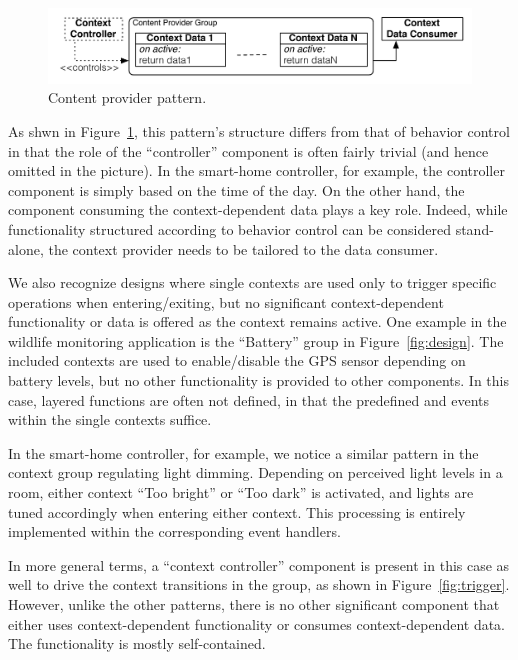 \begin{figure}[tb]
\begin{center}
\includegraphics[scale=.5]{imgs/content_provider}
\vspace{-7mm}
\caption{Content provider pattern.}
  \label{fig:provider}
\vspace{-8mm}
\end{center}
\end{figure}

As shwn in Figure~\ref{fig:provider}, this pattern's structure differs
from that of behavior control in that the role of the ``controller''
component is often fairly trivial (and hence omitted in the
picture). In the smart-home controller, for example, the controller
component is simply based on the time of the day. On the other hand,
the component consuming the context-dependent data plays a key
role. Indeed, while functionality structured according to behavior
control can be considered stand-alone, the context provider needs to
be tailored to the data consumer.

 We also recognize designs where single contexts are
used only to trigger specific operations when entering/exiting, but no
significant context-dependent functionality or data is offered as the
context remains active. One example in the wildlife monitoring
application is the ``Battery'' group in Figure~\ref{fig:design}. The
included contexts are used to enable/disable the GPS sensor depending
on battery levels, but no other functionality is provided to other
components. In this case, layered functions are often not defined, in
that the predefined  and  events
within the single contexts suffice.

In the smart-home controller, for example, we notice a similar pattern
in the context group regulating light dimming. Depending on
perceived light levels in a room, either context ``Too bright'' or
``Too dark'' is activated, and lights are tuned accordingly when
entering either context. This processing is entirely implemented
within the corresponding  event handlers. 

In more general terms, a ``context controller'' component is present
in this case as well to drive the context transitions in the group, as
shown in Figure~\ref{fig:trigger}. However, unlike the other patterns,
there is no other significant component that either uses
context-dependent functionality or consumes context-dependent
data. The functionality is mostly self-contained.


